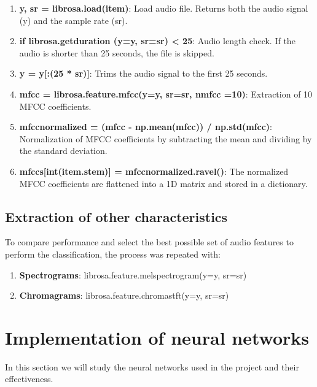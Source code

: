 \begin{enumerate}
\item \textbf{y, sr = librosa.load(item)}: Load audio file. Returns both the audio signal (y) and the sample rate (sr).

\item \textbf{if librosa.get\textunderscore duration (y=y, sr=sr) < 25}: Audio length check. If the audio is shorter than 25 seconds, the file is skipped.

\item \textbf{y = y[:(25 * sr)]}: Trims the audio signal to the first 25 seconds.

\item\textbf{mfcc = librosa.feature.mfcc(y=y, sr=sr, n\textunderscore mfcc =10)}: Extraction of 10 MFCC coefficients.

\item \textbf{mfcc\textunderscore normalized = (mfcc - np.mean(mfcc)) / np.std(mfcc)}: Normalization of MFCC coefficients by subtracting the mean and dividing by the standard deviation.

\item\textbf{mfccs[int(item.stem)] = mfcc\textunderscore normalized.ravel()}: The normalized MFCC coefficients are flattened into a 1D matrix and stored in a dictionary.
\end{enumerate}

\subsection{Extraction of other characteristics}

To compare performance and select the best possible set of audio features to perform the classification, the process was repeated with:

\begin{enumerate}
\item \textbf{Spectrograms}: librosa.feature.melspectrogram(y=y, sr=sr)

\item \textbf{Chromagrams}: librosa.feature.chroma\textunderscore stft(y=y, sr=sr)
\end{enumerate}

\newpage

\section{Implementation of neural networks}

In this section we will study the neural networks used in the project and their effectiveness.

